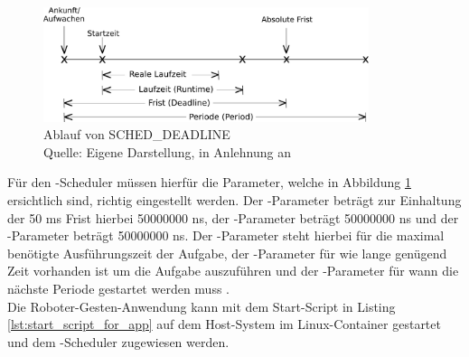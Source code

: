 \begin{figure}[htb]
	\centering
	\includegraphics[width=0.85\textwidth]{images/anhang/sched_deadline}
	\caption[Ablauf von SCHED\_DEADLINE]{Ablauf von SCHED\_DEADLINE\\Quelle: Eigene Darstellung, in Anlehnung an \cite{man_sched7_nodate}}
	\label{fig:sched_deadline}
\end{figure}
\FloatBarrier

Für den -Scheduler müssen hierfür die Parameter, welche in Abbildung \ref{fig:sched_deadline} ersichtlich sind, richtig eingestellt werden. Der -Parameter beträgt zur Einhaltung der 50 ms Frist hierbei 50000000 ns, der -Parameter beträgt 50000000 ns und der -Parameter beträgt 50000000 ns. Der -Parameter steht hierbei für die maximal benötigte Ausführungszeit der Aufgabe, der -Parameter für wie lange genügend Zeit vorhanden ist um die Aufgabe auszuführen und der -Parameter für wann die nächste Periode gestartet werden muss \cite{man_sched7_nodate}.\\

Die Roboter-Gesten-Anwendung kann mit dem Start-Script in Listing \ref{lst:start_script_for_app} auf dem Host-System im Linux-Container gestartet und dem -Scheduler zugewiesen werden.\\

